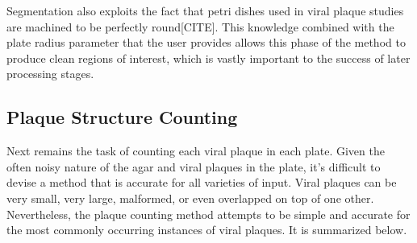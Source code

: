 \documentclass[11pt,final,twocolumn]{IEEEtran}
\begin{document}
Segmentation also exploits the fact that petri dishes used in viral plaque studies are machined to be perfectly round[CITE]. This knowledge combined with the plate radius parameter that the user provides allows this phase of the method to produce clean regions of interest, which is vastly important to the success of later  processing stages.

\subsection{Plaque Structure Counting}
Next remains the task of counting each viral plaque in each plate. Given the often noisy nature of the agar and viral plaques in the plate, it’s difficult to devise a method that is accurate for all varieties of input. Viral plaques can be very small, very large, malformed, or even overlapped on top of one other. Nevertheless, the plaque counting method attempts to be simple and accurate for the most commonly occurring instances of viral plaques. It is summarized below.  
\end{document}
